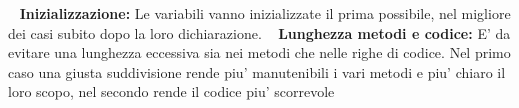 	~\newline
	\textbf{Inizializzazione:} Le variabili vanno inizializzate il prima possibile, nel migliore dei casi subito dopo la loro dichiarazione. \newline
	~\newline
	\textbf{Lunghezza metodi e codice:} E' da evitare una lunghezza eccessiva sia nei metodi che nelle righe di codice. Nel primo caso una giusta suddivisione rende piu' manutenibili i vari metodi e piu' chiaro il loro scopo, nel secondo rende il codice piu' scorrevole \newline